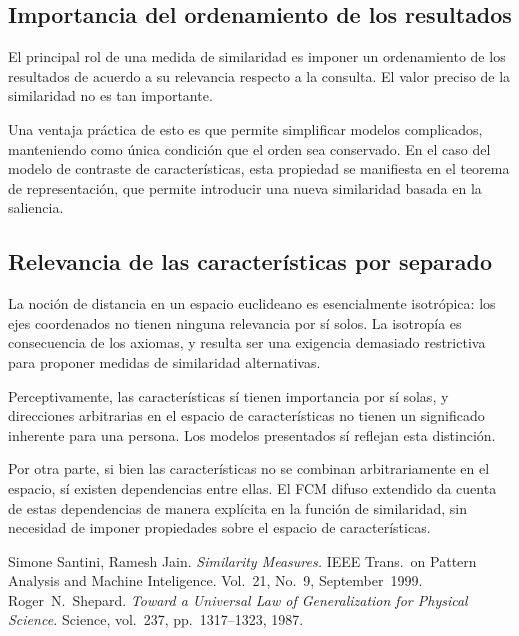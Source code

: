 \documentclass[spanish]{article}
\begin{document}
\subsection{Importancia del ordenamiento de los resultados}
El principal rol de una medida de similaridad es imponer un ordenamiento de los
resultados de acuerdo a su relevancia respecto a la consulta.  El valor preciso
de la similaridad no es tan importante.

Una ventaja práctica de esto es que permite simplificar modelos complicados,
manteniendo como única condición que el orden sea conservado.  En el caso del
modelo de contraste de características, esta propiedad se manifiesta en el
teorema de representación, que permite introducir una nueva similaridad basada
en la saliencia.

\subsection{Relevancia de las características por separado}
La noción de distancia en un espacio euclideano es esencialmente isotrópica: los
ejes coordenados no tienen ninguna relevancia por sí solos.  La isotropía es
consecuencia de los axiomas, y resulta ser una exigencia demasiado restrictiva
para proponer medidas de similaridad alternativas.

Perceptivamente, las características sí tienen importancia por sí
solas, y direcciones arbitrarias en el espacio de características no tienen
un significado inherente para una persona.  Los modelos presentados sí reflejan
esta distinción.

Por otra parte, si bien las características no se combinan arbitrariamente en el
espacio, sí existen dependencias entre ellas.  El FCM difuso extendido da cuenta
de estas dependencias de manera explícita en la función de similaridad, sin
necesidad de imponer propiedades sobre el espacio de características.



\begin{thebibliography}{99}
        Simone Santini, Ramesh Jain.
        \emph{Similarity Measures.}
        IEEE Trans.~on Pattern Analysis and Machine Inteligence.
        Vol.~21, No.~9, September~1999.
        Roger~{}N.~Shepard.
        \emph{Toward a Universal Law of Generalization for Physical Science.}
        Science, vol.~237, pp.~1317--1323, 1987.
\end{thebibliography}
\end{document}
